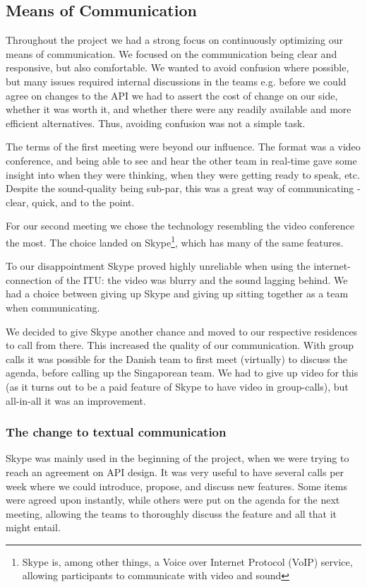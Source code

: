 \subsection{Means of Communication}

Throughout the project we had a strong focus on continuously optimizing our
means of communication. We focused on the communication being clear and
responsive, but also comfortable. We wanted to avoid confusion where possible,
but many issues required internal discussions in the teams e.g. before we could agree 
on changes to the API we had to assert the cost of change on our side, whether it
was worth it, and whether there were any readily available and more efficient
alternatives. Thus, avoiding confusion was not a simple task.

The terms of the first meeting were beyond our influence. The format was a
video conference, and being able to see and hear the
other team in real-time gave some insight into when they were thinking, when
they were getting ready to speak, etc. Despite the sound-quality being sub-par,
this was a great way of communicating - clear, quick, and to the point.

For our second meeting we chose the technology resembling the video conference
the most. The choice landed on Skype\footnote{ Skype is, among other things, a
Voice over Internet Protocol (VoIP) service, allowing participants to
communicate with video and sound}, which has
many of the same features.

To our disappointment Skype proved highly unreliable when using the internet-connection of the ITU: the video was blurry
and the sound lagging behind. We had a choice between giving up Skype and giving up sitting together as a team when communicating.

We decided to give Skype another chance and moved to our respective residences to call from there. This increased the quality of our communication. With group calls it was
possible for the Danish team to first meet (virtually) to discuss the agenda, before calling up the Singaporean team. We had to give
up video for this (as it turns out to be a paid feature of Skype to have video in group-calls), but all-in-all it was an improvement.

\subsubsection{The change to textual communication}
Skype was mainly used in the beginning of the project, when we were trying to reach an agreement on API design. It was very
useful to have several calls per week where we could introduce, propose, and discuss new features. Some items were
agreed upon instantly, while others were put on the agenda for the next meeting, allowing the teams to thoroughly discuss the feature
and all that it might entail.


